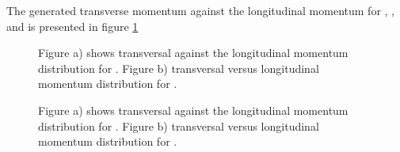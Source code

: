 The generated transverse momentum against the longitudinal momentum for \lam, \alam, \anticascade and \excitedcascade is 
presented in figure \ref{fig:MC_lambda0_pt_vs_pz}%


\begin{figure}
	\caption{Figure a) shows transversal against the longitudinal momentum distribution for \lam. Figure b) 
			transversal versus longitudinal momentum distribution for \alam.}
	\label{fig:MC_lambda0_pt_vs_pz}
\end{figure}


\begin{figure}
	\caption{Figure a) shows transversal against the longitudinal momentum distribution for \anticascade. Figure b) 
			transversal versus longitudinal momentum distribution for \excitedcascade.}
	\label{fig:MC_xi_pt_vs_pz}
\end{figure}

